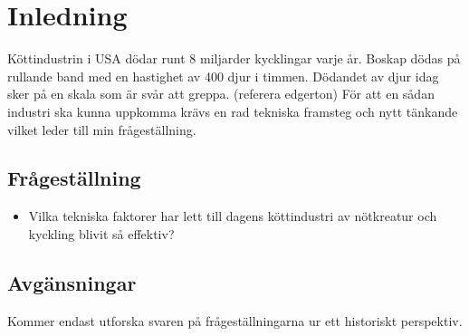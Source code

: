 \section{Inledning}
Köttindustrin i USA dödar runt 8 miljarder kycklingar varje år. Boskap dödas på rullande band med en hastighet av 400 djur i timmen. Dödandet av djur idag sker på en skala som är svår att greppa. (referera edgerton) 
\newline
\newline
För att en sådan industri ska kunna uppkomma krävs en rad tekniska framsteg och nytt tänkande vilket leder till min frågeställning.  

\subsection{Frågeställning}
\begin{itemize}
	\item Vilka tekniska faktorer har lett till dagens köttindustri av nötkreatur och kyckling blivit så effektiv?
\end{itemize}

\subsection{Avgänsningar}
Kommer endast utforska svaren på frågeställningarna ur ett historiskt perspektiv. 